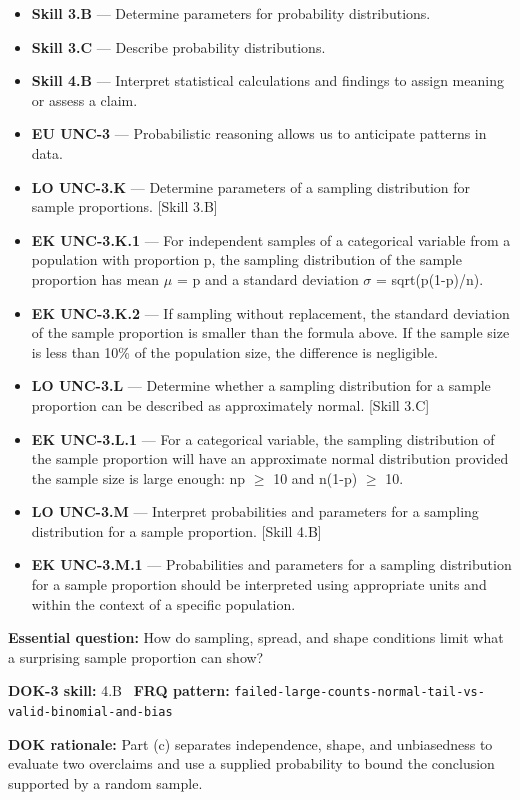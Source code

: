\documentclass[11pt]{article}
\begin{document}


{\small
\begin{itemize}[leftmargin=1.5em,itemsep=2pt,topsep=2pt]
  \item \textbf{Skill 3.B} --- Determine parameters for probability distributions.
  \item \textbf{Skill 3.C} --- Describe probability distributions.
  \item \textbf{Skill 4.B} --- Interpret statistical calculations and findings to assign meaning or assess a claim.
  \item \textbf{EU UNC-3} --- Probabilistic reasoning allows us to anticipate patterns in data.
  \item \textbf{LO UNC-3.K} --- Determine parameters of a sampling distribution for sample proportions. [Skill 3.B]
  \item \textbf{EK UNC-3.K.1} --- For independent samples of a categorical variable from a population with proportion p, the sampling distribution of the sample proportion has mean $\mu$ = p and a standard deviation $\sigma$ = sqrt(p(1-p)/n).
  \item \textbf{EK UNC-3.K.2} --- If sampling without replacement, the standard deviation of the sample proportion is smaller than the formula above. If the sample size is less than 10\% of the population size, the difference is negligible.
  \item \textbf{LO UNC-3.L} --- Determine whether a sampling distribution for a sample proportion can be described as approximately normal. [Skill 3.C]
  \item \textbf{EK UNC-3.L.1} --- For a categorical variable, the sampling distribution of the sample proportion will have an approximate normal distribution provided the sample size is large enough: np $\geq$ 10 and n(1-p) $\geq$ 10.
  \item \textbf{LO UNC-3.M} --- Interpret probabilities and parameters for a sampling distribution for a sample proportion. [Skill 4.B]
  \item \textbf{EK UNC-3.M.1} --- Probabilities and parameters for a sampling distribution for a sample proportion should be interpreted using appropriate units and within the context of a specific population.
\end{itemize}
}
\textbf{Essential question:} How do sampling, spread, and shape conditions limit what a surprising sample proportion can show?\par
\textbf{DOK-3 skill:} 4.B \textperiodcentered\ \textbf{FRQ pattern:} {\small\texttt{failed-\allowbreak{}large-\allowbreak{}counts-\allowbreak{}normal-\allowbreak{}tail-\allowbreak{}vs-\allowbreak{}valid-\allowbreak{}binomial-\allowbreak{}and-\allowbreak{}bias}}\par
\textbf{DOK rationale:} Part (c) separates independence, shape, and unbiasedness to evaluate two overclaims and use a supplied probability to bound the conclusion supported by a random sample.\par
\end{document}
